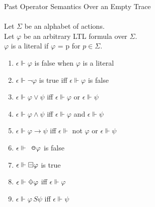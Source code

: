 \begin{definition}Past Operator Semantics Over an Empty Trace\\
\label{def:Past Empty trace semantics}
\\
Let $\Sigma$ be an alphabet of actions.\\
Let $\varphi$ be an arbitrary LTL formula over $\Sigma$.\\
$\varphi$ is a literal if $\varphi$ = p for $ p \in \Sigma $.

\begin{enumerate}[start = 19]
\item $\epsilon \Vdash \varphi $ is false when $ \varphi $ is a literal
\item $\epsilon \Vdash \neg\varphi $ is true iff $ \epsilon \Vdash \varphi $ is false
\item $\epsilon \Vdash \varphi \lor \psi $ iff $ \epsilon \Vdash \varphi $ or $ \epsilon \Vdash \psi $
\item $\epsilon \Vdash \varphi \land \psi $ iff $ \epsilon \Vdash \varphi $ and $ \epsilon \Vdash \psi $
\item $\epsilon \Vdash \varphi \rightarrow \psi $ iff $ \epsilon \Vdash $ not $ \varphi $ or $ \epsilon \Vdash \psi $
\item $\epsilon \Vdash \LTLprevious\varphi $ is false
\item $\epsilon \Vdash \LTLalwaysbeen\varphi $ is true
\item $\epsilon \Vdash \LTLonce\varphi $ iff $ \epsilon \Vdash \varphi $
\item $\epsilon \Vdash \varphi \,S \psi $ iff $ \epsilon \Vdash \psi $
\end{enumerate}
\end{definition}

